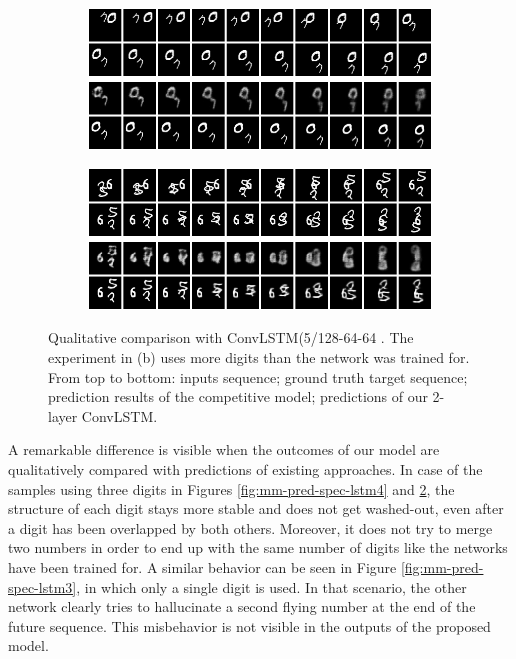 \begin{figure}[h!tb]
\centering
\begin{subfigure}{0.49\textwidth}
  \centering
  \includegraphics[width=0.92\linewidth]{figures/pred/mm/spec/prediction-04.png}
  \caption{}
  \label{fig:mm-pred-spec2-clstm1}
\end{subfigure}%
\begin{subfigure}{0.49\textwidth}
  \centering
  \includegraphics[width=0.92\linewidth]{figures/pred/mm/spec/prediction-05.png}
  \caption{}
  \label{fig:mm-pred-spec2-clstm2}
\end{subfigure}
\caption[Comparison with other ConvLSTM on Moving MNIST]{Qualitative comparison with ConvLSTM(5/128-64-64 \parencite{conv_lstm_nowcasting}. The experiment in (b) uses more digits than the network was trained for. From top to bottom: inputs sequence; ground truth target sequence; prediction results of the competitive model; predictions of our 2-layer ConvLSTM.} \label{fig:mm-pred-spec2-clstm}
\end{figure}

A remarkable difference is visible when the outcomes of our model are qualitatively compared with predictions of existing approaches. In case of the samples using three digits in Figures \ref{fig:mm-pred-spec-lstm4} and \ref{fig:mm-pred-spec2-clstm2}, the structure of each digit stays more stable and does not get washed-out, even after a digit has been overlapped by both others. Moreover, it does not try to merge two numbers in order to end up with the same number of digits like the networks have been trained for. A similar behavior can be seen in Figure \ref{fig:mm-pred-spec-lstm3}, in which only a single digit is used. In that scenario, the other network clearly tries to hallucinate a second flying number at the end of the future sequence. This misbehavior is not visible in the outputs of the proposed model.

